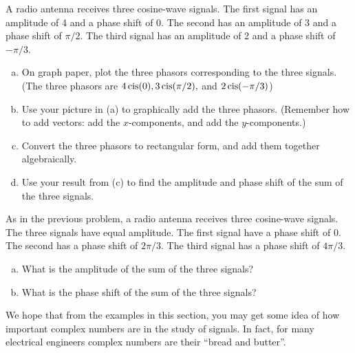 \begin{exercise}\label{exercise:complex:46}
A radio antenna receives three cosine-wave signals. The first signal has an amplitude of 4 and a phase shift of 0. The second has an amplitude of 3 and a phase shift of $\pi/2$. The third signal has an amplitude of 2 and a phase shift of $-\pi/3$.
\begin{enumerate}[(a)]
\item
On graph paper,  plot the three phasors corresponding to the three signals. (The three phasors are $4 \operatorname{cis}(0), 3 \operatorname{cis}(\pi/2),$ and $2 \operatorname{cis}(-\pi/3)$)
\item
Use your picture in (a) to graphically add the three phasors. (Remember how to add vectors:  add the $x$-components, and add the $y$-components.)
\item
Convert the three phasors to rectangular form, and add them together algebraically.
\item
Use your result from (c) to find the amplitude and phase shift of the sum of the three signals.
\end{enumerate}
\end{exercise}


\begin{exercise}\label{exercise:complex:47}
As in the previous problem, a radio antenna receives three cosine-wave signals. The three signals have equal amplitude. The first signal have a phase shift of 0. The second has a phase shift of $2\pi/3$. The third signal has  a phase shift of $4\pi/3$.
\begin{enumerate}[(a)]
\item
 What is the amplitude of the sum of the three signals?
\item
What is the phase shift of the sum of the three signals?
\end{enumerate}
\end{exercise}

We hope that from the examples in this section, you may get some idea of how important complex numbers are in the study of signals. In fact, for many electrical engineers complex numbers are their ``bread and butter''. 

